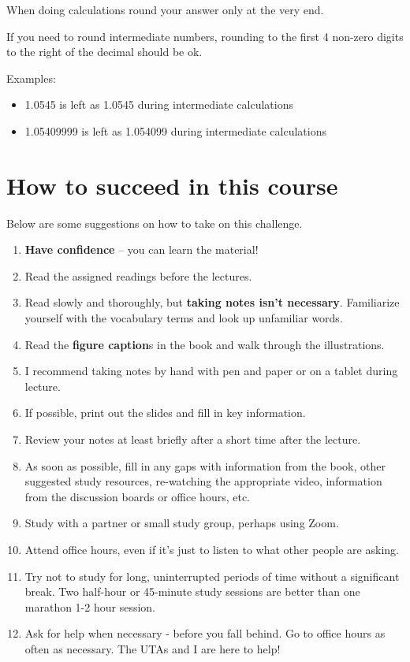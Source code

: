 \documentclass[
]{book}
\providecommand{\tightlist}{%
  \setlength{\itemsep}{0pt}\setlength{\parskip}{0pt}}
\begin{document}
When doing calculations round your answer only at the very end.

If you need to round intermediate numbers, rounding to the first 4 non-zero digits to the right of the decimal should be ok.

Examples:

\begin{itemize}
\tightlist
\item
  1.0545 is left as 1.0545 during intermediate calculations
\item
  1.05409999 is left as 1.054099 during intermediate calculations
\end{itemize}

\hypertarget{how-to-succeed-in-this-course}{%
\chapter{How to succeed in this course}\label{how-to-succeed-in-this-course}}

Below are some suggestions on how to take on this challenge.

\begin{enumerate}
\def\labelenumi{\arabic{enumi}.}
\tightlist
\item
  \textbf{Have confidence} -- you can learn the material!\\
\item
  Read the assigned readings before the lectures.
\item
  Read slowly and thoroughly, but \textbf{taking notes isn't necessary}. Familiarize yourself with the vocabulary terms and look up unfamiliar words.
\item
  Read the \textbf{figure caption}s in the book and walk through the illustrations.
\item
  I recommend taking notes by hand with pen and paper or on a tablet during lecture.
\item
  If possible, print out the slides and fill in key information.
\item
  Review your notes at least briefly after a short time after the lecture.
\item
  As soon as possible, fill in any gaps with information from the book, other suggested study resources, re-watching the appropriate video, information from the discussion boards or office hours, etc.
\item
  Study with a partner or small study group, perhaps using Zoom.
\item
  Attend office hours, even if it's just to listen to what other people are asking.
\item
  Try not to study for long, uninterrupted periods of time without a significant break.
  Two half-hour or 45-minute study sessions are better than one marathon 1-2 hour session.
\item
  Ask for help when necessary - before you fall behind. Go to office hours as often as necessary. The UTAs and I are here to help!
\end{enumerate}
\end{document}
